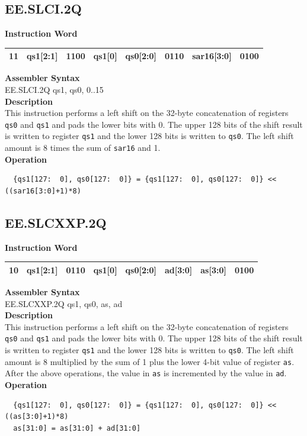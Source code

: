 \clearpage
\subsection{EE.SLCI.2Q}\label{instruction:EESLCI2Q}
\setlength\tabcolsep{6pt}
\textbf{Instruction Word} \\
\begin{tabular}{|c|c|c|c|c|c|c|c|}
	\hline
	11 & qs1[2:1] & 1100 & qs1[0] & qs0[2:0] & 0110 & sar16[3:0] & 0100 \\
	\hline
\end{tabular}

\textbf{Assembler Syntax} \\
EE.SLCI.2Q qs1, qs0, 0..15 \\
\textbf{Description} \\
This instruction performs a left shift on the 32-byte concatenation of registers \lstinline{qs0} and \lstinline{qs1} and pads the lower bits with 0. The upper 128 bits of the shift result is written to register \lstinline{qs1} and the lower 128 bits is written to \lstinline{qs0}. The left shift amount is 8 times the sum of \lstinline{sar16} and 1.\\
\textbf{Operation}
\begin{lstlisting}
  {qs1[127:  0], qs0[127:  0]} = {qs1[127:  0], qs0[127:  0]} << ((sar16[3:0]+1)*8)
\end{lstlisting}

\clearpage
\subsection{EE.SLCXXP.2Q}\label{instruction:EESLCXXP2Q}
\setlength\tabcolsep{6pt}
\textbf{Instruction Word} \\
\begin{tabular}{|c|c|c|c|c|c|c|c|}
	\hline
	10 & qs1[2:1] & 0110 & qs1[0] & qs0[2:0] & ad[3:0] & as[3:0] & 0100 \\
	\hline
\end{tabular}

\textbf{Assembler Syntax} \\
EE.SLCXXP.2Q qs1, qs0, as, ad \\
\textbf{Description} \\
This instruction performs a left shift on the 32-byte concatenation of registers \lstinline{qs0} and \lstinline{qs1} and pads the lower bits with 0. The upper 128 bits of the shift result is written to register \lstinline{qs1} and the lower 128 bits is written to \lstinline{qs0}. The left shift amount is 8 multiplied by the sum of 1 plus the lower 4-bit value of register \lstinline{as}. After the above operations, the value in \lstinline{as} is incremented by the value in \lstinline{ad}.\\
\textbf{Operation}
\begin{lstlisting}
  {qs1[127:  0], qs0[127:  0]} = {qs1[127:  0], qs0[127:  0]} << ((as[3:0]+1)*8)
  as[31:0] = as[31:0] + ad[31:0]
\end{lstlisting}

